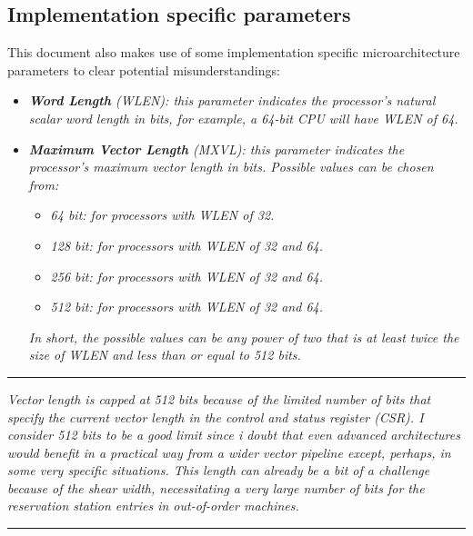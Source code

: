 \documentclass{article}
\begin{document}
        \subsection[Implementation specific parameters]{Implementation specific parameters}

            This document also makes use of some implementation specific microarchitecture parameters to clear potential misunderstandings:

            \begin{itemize}

                \item \textit{\textbf{Word Length} (WLEN): this parameter indicates the processor's natural scalar word length in bits, for example, a 64-bit CPU will have WLEN of 64.}

                \item \textit{\textbf{Maximum Vector Length} (MXVL): this parameter indicates the processor's maximum vector length in bits. Possible values can be chosen from:}

                    \begin{itemize}

                        \item \textit{64 bit: for processors with WLEN of 32.}
                        \item \textit{128 bit: for processors with WLEN of 32 and 64.}
                        \item \textit{256 bit: for processors with WLEN of 32 and 64.}
                        \item \textit{512 bit: for processors with WLEN of 32 and 64.}

                    \end{itemize}

                \textit{In short, the possible values can be any power of two that is at least twice the size of WLEN and less than or equal to 512 bits.}

            \end{itemize}

        \par\noindent\rule{\textwidth}{0.4pt}
        \textit{Vector length is capped at 512 bits because of the limited number of bits that specify the current vector length in the control and status register (CSR). I consider 512 bits to be a good limit since i doubt that even advanced architectures would benefit in a practical way from a wider vector pipeline except, perhaps, in some very specific situations. This length can already be a bit of a challenge because of the shear width, necessitating a very large number of bits for the reservation station entries in out-of-order machines.}
        \par\noindent\rule{\textwidth}{0.4pt}
\end{document}
